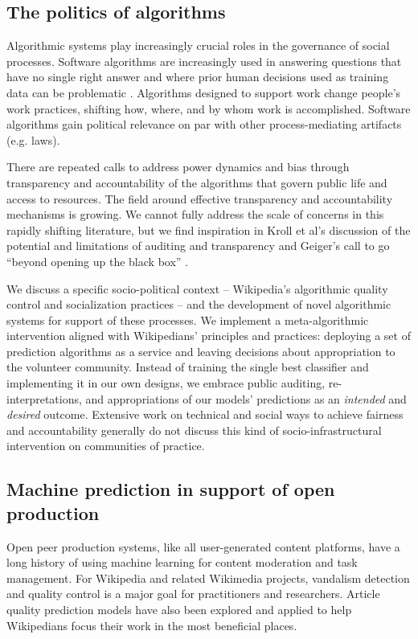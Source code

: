 \subsection{The politics of algorithms}
Algorithmic systems play increasingly crucial roles in the governance of social processes\cite{gillespie2014relevance}. Software algorithms are increasingly used in answering questions that have no single right answer and where prior human decisions used as training data can be problematic \cite{barocas2013governing}. Algorithms designed to support work change people's work practices, shifting how, where, and by whom work is accomplished\cite{crawford2016algorithm, zuboff1988age}. Software algorithms gain political relevance on par with other process-mediating artifacts (e.g. laws\cite{lessig1999code}).

There are repeated calls to address power dynamics and bias through transparency and accountability of the algorithms that govern public life and access to resources\cite{diakopoulos2017algorithmic,sandvig2014auditing}. The field around effective transparency and accountability mechanisms is growing. We cannot fully address the scale of concerns in this rapidly shifting literature, but we find inspiration in Kroll et al's discussion of the potential and limitations of auditing and transparency\cite{kroll2016accountable} and Geiger's call to go ``beyond opening up the black box'' \cite{geiger2017beyond}.

We discuss a specific socio-political context -- Wikipedia's algorithmic quality control and socialization practices -- and the development of novel algorithmic systems for support of these processes.  We implement a meta-algorithmic intervention aligned with Wikipedians' principles and practices: deploying a set of prediction algorithms as a service and leaving decisions about appropriation to the volunteer community.  Instead of training the single best classifier and implementing it in our own designs, we embrace public auditing, re-interpretations, and appropriations of our models' predictions as an \emph{intended} and \emph{desired} outcome.  Extensive work on technical and social ways to achieve fairness and accountability generally do not discuss this kind of socio-infrastructural intervention on communities of practice.

\subsection{Machine prediction in support of open production}
Open peer production systems, like all user-generated content platforms, have a long history of using machine learning for content moderation and task management. For Wikipedia and related Wikimedia projects, vandalism detection and quality control is a major goal for practitioners and researchers.  Article quality prediction models have also been explored and applied to help Wikipedians focus their work in the most beneficial places.

